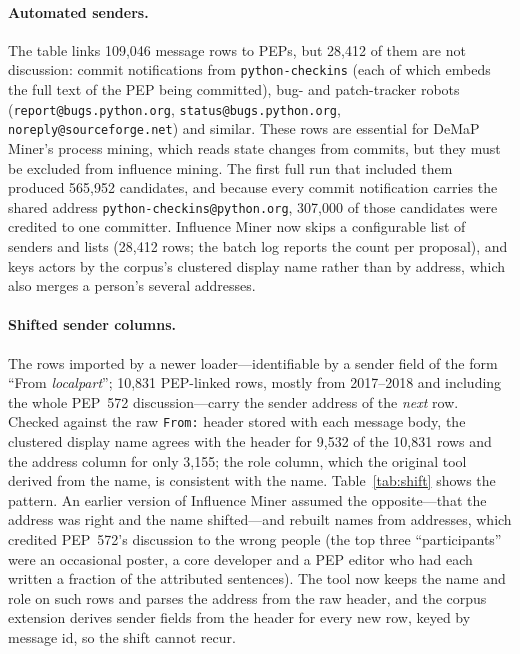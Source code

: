 \documentclass[sigconf,screen]{acmart}
\begin{document}
\paragraph{Automated senders.} The table links 109,046 message rows to PEPs, but 28,412 of them are not discussion: commit notifications from \texttt{python-checkins} (each of which embeds the full text of the PEP being committed), bug- and patch-tracker robots (\texttt{report@\allowbreak bugs.python.org}, \texttt{status@\allowbreak bugs.python.org}, \texttt{noreply@\allowbreak sourceforge.net}) and similar. These rows are essential for DeMaP Miner's process mining, which reads state changes from commits, but they must be excluded from influence mining. The first full run that included them produced 565,952 candidates, and because every commit notification carries the shared address \texttt{python-checkins@python.org}, 307,000 of those candidates were credited to one committer. Influence Miner now skips a configurable list of senders and lists (28,412 rows; the batch log reports the count per proposal), and keys actors by the corpus's clustered display name rather than by address, which also merges a person's several addresses.

\paragraph{Shifted sender columns.} The rows imported by a newer loader---identifiable by a sender field of the form ``From \emph{localpart}''; 10,831 PEP-linked rows, mostly from 2017--2018 and including the whole PEP~572 discussion---carry the sender address of the \emph{next} row. Checked against the raw \texttt{From:} header stored with each message body, the clustered display name agrees with the header for 9,532 of the 10,831 rows and the address column for only 3,155; the role column, which the original tool derived from the name, is consistent with the name. Table~\ref{tab:shift} shows the pattern. An earlier version of Influence Miner assumed the opposite---that the address was right and the name shifted---and rebuilt names from addresses, which credited PEP~572's discussion to the wrong people (the top three ``participants'' were an occasional poster, a core developer and a PEP editor who had each written a fraction of the attributed sentences). The tool now keeps the name and role on such rows and parses the address from the raw header, and the corpus extension derives sender fields from the header for every new row, keyed by message id, so the shift cannot recur.
\end{document}
